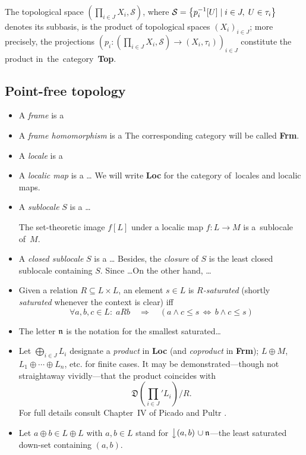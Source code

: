 \begin{fact}
  The topological space $\left( \prod_{i\in J} X_i, \mathcal{S} \right)$, where
  $\mathcal{S} = \left\{ p_{i}^{-1}[U] \mid i\in J, \; U\in \tau_i \right\}$
  denotes its subbasis, is the product of topological spaces $\left( X_i
  \right)_{i\in J}$;
  more precisely, the projections $\left( p_i\colon \left(\prod_{i\in J} X_i,
  \mathcal{S}\right) \to \left(X_i, \tau_i\right) \right)_{i\in J}$
  constitute the product in~the~category~{\bf Top}.
\end{fact}

\subsection*{Point-free topology}

\begin{itemize}
\item A \emph{frame} is a
\item A \emph{frame homomorphism} is a
The corresponding category will be called {\bf Frm}.
\item A \emph{locale} is a
\item A \emph{localic map} is a \ldots
We will write {\bf Loc} for the category of~locales and localic maps.
\item A \emph{sublocale} $S$ is a \ldots
  \begin{fact}
    The set-theoretic image $f[L]$ under a localic map $f\colon L\to M$
    is a~sublocale of~$M$.
  \end{fact}
\item A \emph{closed sublocale} $S$ is a \ldots
Besides, the \emph{closure} of $S$ is the least closed sublocale containing $S$.
Since \ldots On the other hand, \ldots
\item Given a relation $R\subseteq L \times L$, an element $s\in L$ is
\emph{$R$-saturated} (shortly \emph{saturated} whenever the context is clear)
  iff
\[
  \forall a, b, c\in L: \; aRb \quad \Rightarrow \quad \left( a \wedge c \leq s
  \, \Leftrightarrow \, b \wedge c \leq s \right)
\]
\item The letter $\mathfrak{n}$ is the notation for the smallest saturated\ldots
\item Let $\bigoplus_{i\in J} L_i$ designate a \emph{product} in {\bf Loc} (and
\emph{coproduct} in {\bf Frm}); $L \oplus M$, $L_1 \oplus\cdots\oplus L_n$, etc.
for finite cases.
It may be demonstrated---though not straightaway vividly---that the product
coincides with
\[
  \textstyle\mathfrak{D}\left(\prod_{i\in J}\nolimits' L_{i}\right)/R.
\]
For full details consult Chapter~IV of Picado and Pultr \cite{picado-pultr12}.
\item Let $a \oplus b \in L \oplus L$ with $a, b\in L$ stand for
$\left\downarrow (a, b) \right. \cup \mathfrak{n}$---the least saturated down-set
containing $(a, b)$.
\end{itemize}

